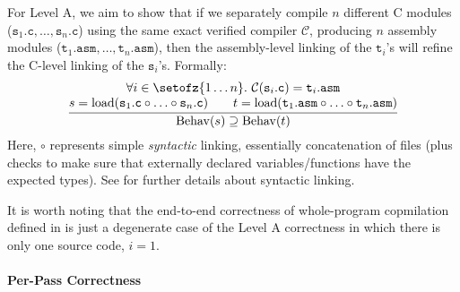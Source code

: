 For Level A, we aim to show that if we separately compile $n$
different C modules
($\mathtt{s}_1\mathtt{.c},\ldots,\mathtt{s}_n\mathtt{.c}$) using the
same exact verified compiler $\mathcal{C}$, producing $n$ assembly
modules
($\mathtt{t}_1\mathtt{.asm},\ldots,\mathtt{t}_n\mathtt{.asm}$), then
the assembly-level linking of the $\mathtt{t}_i$'s will refine the
C-level linking of the $\mathtt{s}_i$'s.  Formally:
\[
\frac{
\begin{array}{@{}c@{}}
\forall i\in\setofz{1\ldots n}.~\mathcal{C}(\mathtt{s}_i\mathtt{.c}) = \mathtt{t}_i\mathtt{.asm} \\
s = \mathrm{load}(\mathtt{s}_1\mathtt{.c}\circ \ldots \circ \mathtt{s}_n\mathtt{.c})\qquad
t = \mathrm{load}(\mathtt{t}_1\mathtt{.asm}\circ \ldots \circ \mathtt{t}_n\mathtt{.asm})
\end{array}
}
{\mathrm{Behav}(s) \supseteq \mathrm{Behav}(t)}
\]
Here, $\circ$ represents simple \emph{syntactic} linking, \ie
essentially concatenation of files (plus checks to make sure that
externally declared variables/functions have the expected types).  See
 for further details about syntactic
linking.

It is worth noting that the end-to-end correctness of whole-program copmilation defined in
 is just a degenerate case of the Level A correctness in which
there is only one source code, \ie $i=1$.

\newcommand{\mys}[1]{\mathtt{s}_{#1}}
\newcommand{\myt}[1]{\mathtt{t}_{#1}}

\paragraph{Per-Pass Correctness}

